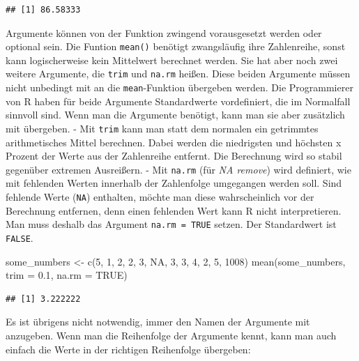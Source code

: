 \documentclass[
]{book}
\newenvironment{Shaded}{\begin{snugshade}}{\end{snugshade}}
\newcommand{\AttributeTok}[1]{\textcolor[rgb]{0.77,0.63,0.00}{#1}}
\newcommand{\ConstantTok}[1]{\textcolor[rgb]{0.00,0.00,0.00}{#1}}
\newcommand{\DecValTok}[1]{\textcolor[rgb]{0.00,0.00,0.81}{#1}}
\newcommand{\FloatTok}[1]{\textcolor[rgb]{0.00,0.00,0.81}{#1}}
\newcommand{\FunctionTok}[1]{\textcolor[rgb]{0.00,0.00,0.00}{#1}}
\newcommand{\NormalTok}[1]{#1}
\newcommand{\OtherTok}[1]{\textcolor[rgb]{0.56,0.35,0.01}{#1}}
\begin{document}
\begin{verbatim}
## [1] 86.58333
\end{verbatim}

Argumente können von der Funktion zwingend vorausgesetzt werden oder optional sein. Die Funtion \texttt{mean()} benötigt zwangsläufig ihre Zahlenreihe, sonst kann logischerweise kein Mittelwert berechnet werden. Sie hat aber noch zwei weitere Argumente, die \texttt{trim} und \texttt{na.rm} heißen. Diese beiden Argumente müssen nicht unbedingt mit an die \texttt{mean}-Funktion übergeben werden. Die Programmierer von R haben für beide Argumente Standardwerte vordefiniert, die im Normalfall sinnvoll sind. Wenn man die Argumente benötigt, kann man sie aber zusätzlich mit übergeben.
- Mit \texttt{trim} kann man statt dem normalen ein getrimmtes arithmetisches Mittel berechnen. Dabei werden die niedrigsten und höchsten x Prozent der Werte aus der Zahlenreihe entfernt. Die Berechnung wird so stabil gegenüber extremen Ausreißern.
- Mit \texttt{na.rm} (für \emph{NA remove}) wird definiert, wie mit fehlenden Werten innerhalb der Zahlenfolge umgegangen werden soll. Sind fehlende Werte (\texttt{NA}) enthalten, möchte man diese wahrscheinlich vor der Berechnung entfernen, denn einen fehlenden Wert kann R nicht interpretieren. Man muss deshalb das Argument \texttt{na.rm\ =\ TRUE} setzen. Der Standardwert ist \texttt{FALSE}.

\begin{Shaded}
\begin{Highlighting}[]
\NormalTok{some\_numbers }\OtherTok{\textless{}{-}} \FunctionTok{c}\NormalTok{(}\DecValTok{5}\NormalTok{, }\DecValTok{1}\NormalTok{, }\DecValTok{2}\NormalTok{, }\DecValTok{2}\NormalTok{, }\DecValTok{3}\NormalTok{, }\ConstantTok{NA}\NormalTok{, }\DecValTok{3}\NormalTok{, }\DecValTok{3}\NormalTok{, }\DecValTok{4}\NormalTok{, }\DecValTok{2}\NormalTok{, }\DecValTok{5}\NormalTok{, }\DecValTok{1008}\NormalTok{)}
\FunctionTok{mean}\NormalTok{(some\_numbers, }\AttributeTok{trim =} \FloatTok{0.1}\NormalTok{, }\AttributeTok{na.rm =} \ConstantTok{TRUE}\NormalTok{)}
\end{Highlighting}
\end{Shaded}

\begin{verbatim}
## [1] 3.222222
\end{verbatim}

Es ist übrigens nicht notwendig, immer den Namen der Argumente mit anzugeben. Wenn man die Reihenfolge der Argumente kennt, kann man auch einfach die Werte in der richtigen Reihenfolge übergeben:
\end{document}
